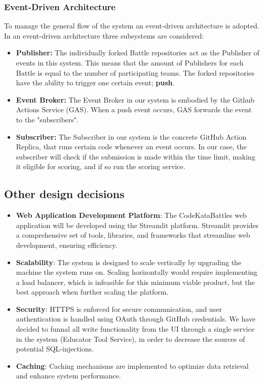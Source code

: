 \subsubsection{Event-Driven Architecture}
To manage the general flow of the system an event-driven architecture is adopted. In an event-driven architecture three subsystems are considered:
\begin{itemize}
    \item \textbf{Publisher:} The individually forked Battle repositories act as the Publisher of events in this system. This means that the amount of Publishers for each Battle is equal to the number of participating teams. The forked repositories have the ability to trigger one certain event; \textbf{push}.  
    
    \item \textbf{Event Broker:} The Event Broker in our system is embodied by the Github Actions Service (GAS). When a push event occurs, GAS forwards the event to the "subscribers". 
    
    \item \textbf{Subscriber:} The Subscriber in our system is the concrete GitHub Action Replica, that runs certain code whenever an event occurs. In our case, the subscriber will check if the submission is made within the time limit, making it eligible for scoring, and if so run the scoring service. 
\end{itemize}

 
\subsection{Other design decisions}
\begin{itemize}
    \item \textbf {Web Application Development Platform}: The CodeKataBattles web application will be developed using the Streamlit platform. Streamlit provides a comprehensive set of tools, libraries, and frameworks that streamline web development, ensuring efficiency.
    \item \textbf{Scalability}: %
    The system is designed to scale vertically by upgrading the machine the system runs on. Scaling horizontally would require implementing a load balancer, which is infeasible for this minimum viable product, but the best approach when further scaling the platform. 
    \item \textbf{Security}: HTTPS is enforced for secure communication, and user authentication is handled using OAuth through GitHub credentials. We have decided to funnal all write functionality from the UI through a single service in the system (Educator Tool Service), in order to decrease the sources of potential SQL-injections. 
    \item \textbf{Caching}: Caching mechanisms are implemented to optimize data retrieval and enhance system performance.
\end{itemize}

